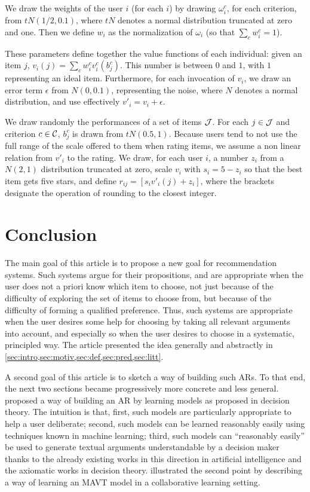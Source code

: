 \documentclass[version=3.21, pagesize, twoside=off, bibliography=totoc, DIV=calc, fontsize=12pt, a4paper, french, english]{scrartcl}
\begin{document}
We draw the weights of the user $i$ (for each $i$) by drawing $\omega^c_i$, for each criterion, from $tN(1/2, 0.1)$, where $tN$ denotes a normal distribution truncated at zero and one. Then we define $w_i$ as the normalization of $\omega_i$ (so that $\sum_c w_i^c = 1$).

These parameters define together the value functions of each individual: given an item $j$, $v_i(j) = \sum_c w^c_i v_i^c(b^c_j)$. This number is between $0$ and $1$, with $1$ representing an ideal item. Furthermore, for each invocation of $v_i$, we draw an error term $\epsilon$ from $N(0, 0.1)$, representing the noise, where $N$ denotes a normal distribution, and use effectively $v'_i = v_i + \epsilon$.

We draw randomly the performances of a set of items $\mathcal{J}$. For each $j \in \mathcal{J}$ and criterion $c \in \mathcal{C}$, $b_j^c$ is drawn from $tN(0.5, 1)$. Because users tend to not use the full range of the scale offered to them when rating items, we assume a non linear relation from $v'_i$ to the rating. We draw, for each user $i$, a number $z_i$ from a $N(2, 1)$ distribution truncated at zero, scale $v_i$ with $s_i = 5 - z_i$ so that the best item gets five stars, and define $r_{ij} = [s_i v'_i(j) + z_i]$, where the brackets designate the operation of rounding to the closest integer. 

\section{Conclusion}
The main goal of this article is to propose a new goal for recommendation systems. Such systems argue for their propositions, and are appropriate when the user does not a priori know which item to choose, not just because of the difficulty of exploring the set of items to choose from, but because of the difficulty of forming a qualified preference. Thus, such systems are appropriate when the user desires some help for choosing by taking all relevant arguments into account, and especially so when the user desires to choose in a systematic, principled way.
The article presented the idea generally and abstractly in \cref{sec:intro,sec:motiv,sec:def,sec:pred,sec:litt}. 

A second goal of this article is to sketch a way of building such \acp{AR}. To that end, the next two sections became progressively more concrete and less general.  proposed a way of building an \ac{AR} by learning models as proposed in decision theory. The intuition is that, first, such models are particularly appropriate to help a user deliberate; second, such models can be learned reasonably easily using techniques known in machine learning; third, such models can “reasonably easily” be used to generate textual arguments understandable by a decision maker thanks to the already existing works in this direction in artificial intelligence and the axiomatic works in decision theory.  illustrated the second point by describing a way of learning an \ac{MAVT} model in a collaborative learning setting.
\end{document}
